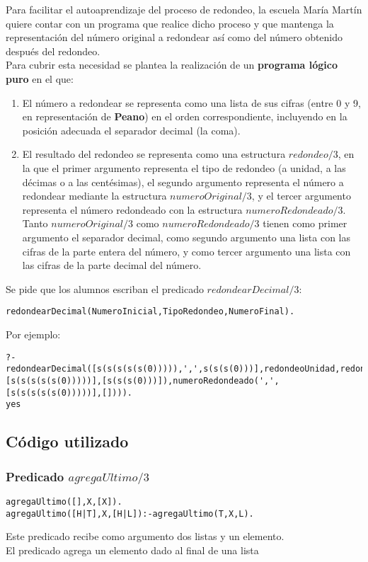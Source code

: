 \documentclass[11pt, a4paper]{article}
\begin{document}
Para facilitar el autoaprendizaje del proceso de redondeo, la escuela María Martín quiere contar con un programa que realice dicho proceso y que mantenga la representación del número original a redondear así como del número obtenido después del redondeo.\\
Para cubrir esta necesidad se plantea la realización de un \textbf{programa lógico puro} en el que:
\begin{enumerate}
 \item El número a redondear se representa como una lista de sus cifras (entre 0 y 9, en representación de \textbf{Peano}) en el orden correspondiente, incluyendo en la posición adecuada el separador decimal (la coma).
 \item El resultado del redondeo se representa como una estructura $redondeo/3$, en la que el primer argumento representa el tipo de redondeo (a unidad, a las décimas o a las centésimas), el segundo argumento representa el número a redondear mediante la estructura $numeroOriginal/3$, y el tercer argumento representa el número redondeado con la estructura $numeroRedondeado/3$.\\Tanto $numeroOriginal/3$ como $numeroRedondeado/3$ tienen como primer argumento el separador decimal, como segundo argumento una lista con las cifras de la parte entera del número, y como tercer argumento una lista con las cifras de la parte decimal del número.
\end{enumerate}
Se pide que los alumnos escriban el predicado $redondearDecimal/3$:
\begin{lstlisting}[frame=single]
redondearDecimal(NumeroInicial,TipoRedondeo,NumeroFinal).
\end{lstlisting}
Por ejemplo:
\begin{lstlisting}[frame=single]
?-redondearDecimal([s(s(s(s(s(0))))),',',s(s(s(0)))],redondeoUnidad,redondeo(redondeoUnidad,numeroOriginal(',',[s(s(s(s(s(0)))))],[s(s(s(0)))]),numeroRedondeado(',',[s(s(s(s(s(0)))))],[]))).
yes
\end{lstlisting}
\subsection{Código utilizado}
\subsubsection{Predicado $agregaUltimo/3$}
\begin{lstlisting}[frame=single]
agregaUltimo([],X,[X]).
agregaUltimo([H|T],X,[H|L]):-agregaUltimo(T,X,L).
\end{lstlisting}
Este predicado recibe como argumento dos listas y un elemento.\\
El predicado agrega un elemento dado al final de una lista
\end{document}
